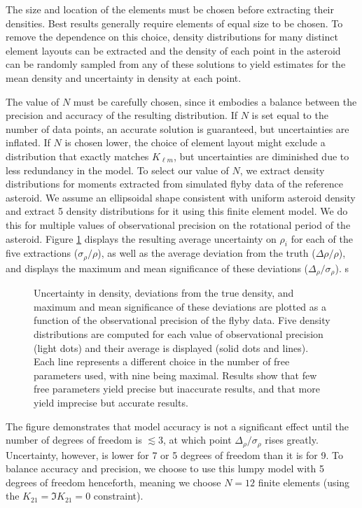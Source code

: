 \documentclass[fleqn,usenatbib]{mnras}
\begin{document}
The size and location of the elements must be chosen before extracting their densities. Best results generally require elements of equal size to be chosen. To remove the dependence on this choice, density distributions for many distinct element layouts can be extracted and the density of each point in the asteroid can be randomly sampled from any of these solutions to yield estimates for the mean density and uncertainty in density at each point.

The value of $N$ must be carefully chosen, since it embodies a balance between the precision and accuracy of the resulting distribution. If $N$ is set equal to the number of data points, an accurate solution is  guaranteed, but uncertainties are inflated. If $N$ is chosen lower, the choice of element layout might exclude a distribution that exactly matches $K_{\ell m}$, but uncertainties are diminished due to less redundancy in the model. To select our value of $N$, we extract density distributions for moments extracted from simulated flyby data of the reference asteroid. We assume an ellipsoidal shape consistent with uniform asteroid density and extract 5 density distributions for it using this finite element model. We do this for multiple values of observational precision on the rotational period of the asteroid. Figure \ref{fig:dof-scan} displays the resulting average uncertainty on $\rho_i$ for each of the five extractions ($\sigma_\rho / \rho$), as well as the average deviation from the truth  ($\Delta \rho / \rho$), and displays the maximum and mean significance of these deviations ($\Delta_\rho / \sigma_\rho$).
s\begin{figure}
  \centering
  \caption{Uncertainty in density, deviations from the true density, and maximum and mean significance of these deviations are plotted as a function of the observational precision of the flyby data. Five density distributions are computed for each value of observational precision (light dots) and their average is displayed (solid dots and lines). Each line represents a different choice in the number of free parameters used, with nine being maximal. Results show that few free parameters yield precise but inaccurate results, and that more yield imprecise but accurate results.}
  \label{fig:dof-scan}
\end{figure}
The figure demonstrates that model accuracy is not a significant effect until the number of degrees of freedom is $\lesssim 3$, at which point $\Delta_\rho / \sigma_\rho$ rises greatly. Uncertainty, however, is lower for 7 or 5 degrees of freedom than it is for 9. To balance accuracy and precision, we choose to use this lumpy model with 5 degrees of freedom henceforth, meaning we choose $N=12$ finite elements (using the $K_{21} = \Im K_{21} = 0$ constraint).
\end{document}
